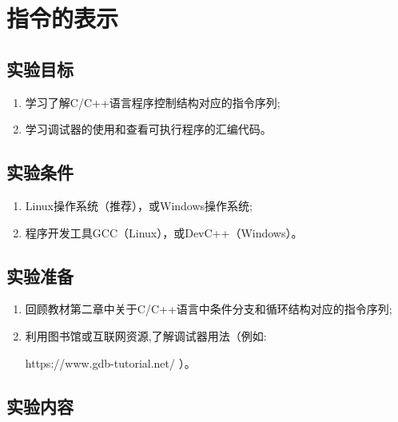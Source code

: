 
\chapter{指令的表示}

\section{实验目标}

\begin{enumerate}
	\item 学习了解C/C++语言程序控制结构对应的指令序列;
	\item 学习调试器的使用和查看可执行程序的汇编代码。
\end{enumerate}

\section{实验条件}

\begin{enumerate}
	\item Linux操作系统（推荐），或Windows操作系统;
	\item 程序开发工具GCC（Linux），或DevC++（Windows）。
\end{enumerate}

\section{实验准备}

\begin{enumerate}
	\item 回顾教材第二章中关于C/C++语言中条件分支和循环结构对应的指令序列;
	\item 利用图书馆或互联网资源,了解调试器用法（例如: 

		https://www.gdb-tutorial.net/ ）。
\end{enumerate}

\section{实验内容}

